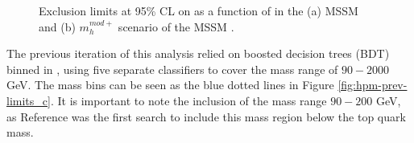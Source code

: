 		\begin{figure}[!ht]
			\centering
			\caption{\label{fig:hpm-tb-tanb-limits} Exclusion limits at 95\% CL on \tanb as a function of \mHpm in the (a) \gls{MSSM} and (b) $m^{mod+}_{h}$ scenario of the \gls{MSSM} \cite{Hpm-to-tb}. }
		\end{figure}


		The previous iteration of this analysis relied on boosted decision trees (BDT) binned in \mHpm, using five separate classifiers to cover the mass range of $90 - 2000$ GeV. The mass bins can be seen as the blue dotted lines in Figure \ref{fig:hpm-prev-limits_c}. It is important to note the inclusion of the mass range $90 - 200$ GeV, as Reference \cite{hpm-previous} was the first search to include this mass region below the top quark mass.